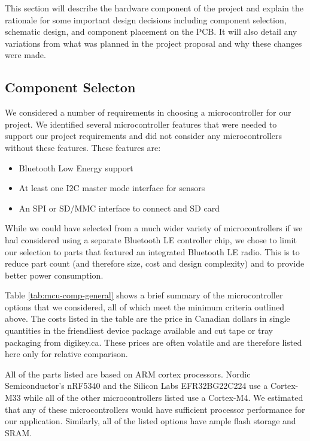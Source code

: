 This section will describe the hardware component of the project and explain 
the rationale for some important design decisions including component selection,
schematic design, and component placement on the PCB. It will also detail any 
variations from what was planned in the project proposal and why these changes
were made.

\subsection{Component Selecton}

We considered a number of requirements in choosing a microcontroller for our
project. We identified several microcontroller features that were needed to
support our project requirements and did not consider any microcontrollers
without these features. These features are:
\begin{itemize}
    \item Bluetooth Low Energy support
    \item At least one I2C master mode interface for sensors
    \item An SPI or SD/MMC interface to connect and SD card
\end{itemize}

While we could have selected from a much wider variety of microcontrollers if we
had considered using a separate Bluetooth LE controller chip, we chose to limit
our selection to parts that featured an integrated Bluetooth LE radio. This is
to reduce part count (and therefore size, cost and design complexity) and to
provide better power consumption.

Table \ref{tab:mcu-comp-general} shows a brief summary of the microcontroller
options that we considered, all of which meet the minimum criteria outlined
above. The costs listed in the table are the price in Canadian dollars in single
quantities in the friendliest device package available and cut tape or tray
packaging from digikey.ca. These prices are often volatile and are therefore
listed here only for relative comparison.

All of the parts listed are based on ARM cortex processors. Nordic
Semiconductor's nRF5340 and the Silicon Labs EFR32BG22C224 use a Cortex-M33
while all of the other microcontrollers listed use a Cortex-M4. We estimated that
any of these microcontrollers would have sufficient processor performance for
our application. Similarly, all of the listed options have ample flash storage
and SRAM.

